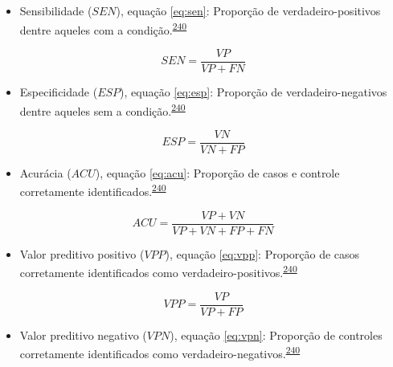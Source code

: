 \documentclass[
  a4paper,
]{book}
\providecommand{\tightlist}{%
  \setlength{\itemsep}{0pt}\setlength{\parskip}{0pt}}
\begin{document}
\begin{itemize}
\tightlist
\item
  Sensibilidade (\(SEN\)), equação \eqref{eq:sen}: Proporção de verdadeiro-positivos dentre aqueles com a condição.\textsuperscript{\protect\hyperlink{ref-greenhalgh1997b}{240}}
\end{itemize}

\begin{equation}
\label{eq:sen}
SEN = \dfrac{VP}{VP+FN}
\end{equation}

\begin{itemize}
\tightlist
\item
  Especificidade (\(ESP\)), equação \eqref{eq:esp}: Proporção de verdadeiro-negativos dentre aqueles sem a condição.\textsuperscript{\protect\hyperlink{ref-greenhalgh1997b}{240}}
\end{itemize}

\begin{equation}
\label{eq:esp}
ESP = \dfrac{VN}{VN+FP}
\end{equation}

\begin{itemize}
\tightlist
\item
  Acurácia (\(ACU\)), equação \eqref{eq:acu}: Proporção de casos e controle corretamente identificados.\textsuperscript{\protect\hyperlink{ref-greenhalgh1997b}{240}}
\end{itemize}

\begin{equation}
\label{eq:acu}
ACU = \dfrac{VP+VN}{VP+VN+FP+FN}
\end{equation}

\begin{itemize}
\tightlist
\item
  Valor preditivo positivo (\(VPP\)), equação \eqref{eq:vpp}: Proporção de casos corretamente identificados como verdadeiro-positivos.\textsuperscript{\protect\hyperlink{ref-greenhalgh1997b}{240}}
\end{itemize}

\begin{equation}
\label{eq:vpp}
VPP = \dfrac{VP}{VP+FP}
\end{equation}

\begin{itemize}
\tightlist
\item
  Valor preditivo negativo (\(VPN\)), equação \eqref{eq:vpn}: Proporção de controles corretamente identificados como verdadeiro-negativos.\textsuperscript{\protect\hyperlink{ref-greenhalgh1997b}{240}}
\end{itemize}
\end{document}
